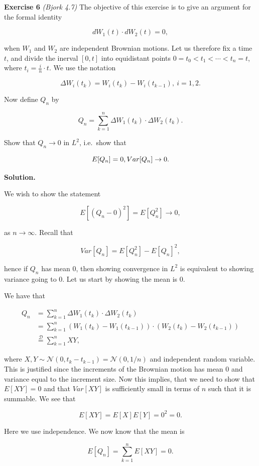 \documentclass[
]{article}
\begin{document}
\textbf{Exercise 6} \emph{(Bjork 4.7)} The objective of this exercise is
to give an argument for the formal identity

\[
dW_1(t)\cdot dW_2(t)=0,
\]

when \(W_1\) and \(W_2\) are independent Brownian motions. Let us
therefore fix a time \(t\), and divide the inerval \([0,t]\) into
equidistant points \(0=t_0<t_1<\cdots < t_n=t\), where
\(t_i=\frac{i}{n}\cdot t\). We use the notation

\[
\Delta W_i(t_k)=W_i(t_k)-W_i(t_{k-1}),\ i=1,2.
\]

Now define \(Q_n\) by

\[
Q_n=\sum_{k=1}^n \Delta W_1(t_k)\cdot \Delta W_2(t_k).
\]

Show that \(Q_n\to 0\) in \(L^2\), i.e.~show that

\[
E[Q_n]=0,\\
Var[Q_n]\to 0.
\]

\textbf{Solution.}

We wish to show the statement

\[
E[(Q_n-0)^2]=E[Q_n^2]\to 0,
\]

as \(n\to \infty\). Recall that

\[
Var[Q_n]=E[Q_n^2]-E[Q_n]^2,
\]

hence if \(Q_n\) has mean 0, then showing convergence in \(L^2\) is
equivalent to showing variance going to 0. Let us start by showing the
mean is 0.

We have that

\begin{align*}
Q_n&=\sum_{k=1}^n \Delta W_1(t_k)\cdot \Delta W_2(t_k)\\
&=\sum_{k=1}^n(W_1(t_k)-W_1(t_{k-1}))\cdot (W_2(t_k)-W_2(t_{k-1}))\\
&\stackrel{\mathcal{D}}{=}\sum_{k=1}^nXY,
\end{align*}

where \(X,Y\sim\mathcal{N}(0,t_k-t_{k-1})=\mathcal{N}(0,1/n)\) and
independent random variable. This is justified since the increments of
the Brownian motion has mean 0 and variance equal to the increment size.
Now this implies, that we need to show that \(E[XY]=0\) and that
\(Var[XY]\) is sufficiently small in terms of \(n\) such that it is
summable. We see that

\[
E[XY]=E[X]E[Y]=0^2=0.
\]

Here we use independence. We now know that the mean is

\[
E[Q_n]=\sum_{k=1}^nE[XY]=0.
\]
\end{document}
